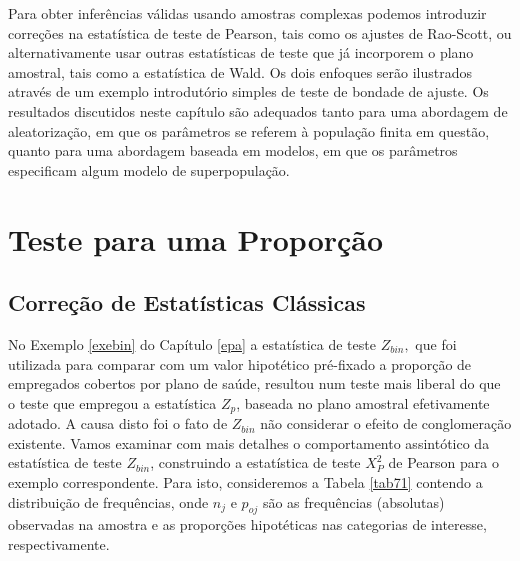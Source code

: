 \documentclass[]{book}
\numberwithin{example}{chapter}
\numberwithin{remark}{chapter}
\numberwithin{definition}{chapter}
\begin{document}
Para obter inferências válidas usando amostras complexas podemos
introduzir correções na estatística de teste de Pearson, tais como os
ajustes de Rao-Scott, ou alternativamente usar outras estatísticas de
teste que já incorporem o plano amostral, tais como a estatística de
Wald. Os dois enfoques serão ilustrados através de um exemplo
introdutório simples de teste de bondade de ajuste. Os resultados
discutidos neste capítulo são adequados tanto para uma abordagem de
aleatorização, em que os parâmetros se referem à população finita em
questão, quanto para uma abordagem baseada em modelos, em que os
parâmetros especificam algum modelo de superpopulação.

\section{Teste para uma Proporção}\label{teste-para-uma-proporcao}

\subsection{Correção de Estatísticas
Clássicas}\label{correcao-de-estatisticas-classicas}

No Exemplo \ref{exebin} do Capítulo \ref{epa} a estatística de teste
\(Z_{bin},\) que foi utilizada para comparar com um valor hipotético
pré-fixado a proporção de empregados cobertos por plano de saúde,
resultou num teste mais liberal do que o teste que empregou a
estatística \(Z_{p}\), baseada no plano amostral efetivamente adotado. A
causa disto foi o fato de \(Z_{bin}\) não considerar o efeito de
conglomeração existente. Vamos examinar com mais detalhes o
comportamento assintótico da estatística de teste \(Z_{bin}\),
construindo a estatística de teste \(X_{P}^{2}\) de Pearson para o
exemplo correspondente. Para isto, consideremos a Tabela \ref{tab71}
contendo a distribuição de frequências, onde \(n_{j}\) e \(p_{oj}\) são
as frequências (absolutas) observadas na amostra e as proporções
hipotéticas nas categorias de interesse, respectivamente.
\end{document}

